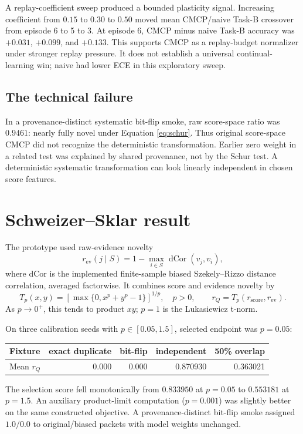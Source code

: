 \documentclass[11pt]{article}
\begin{document}
A replay-coefficient sweep produced a bounded plasticity signal. Increasing coefficient from $0.15$ to $0.30$ to $0.50$ moved mean CMCP/naive Task-B crossover from episode 6 to 5 to 3. At episode 6, CMCP minus naive Task-B accuracy was $+0.031$, $+0.099$, and $+0.133$. This supports CMCP as a replay-budget normalizer under stronger replay pressure. It does not establish a universal continual-learning win; naive had lower ECE in this exploratory sweep.

\subsection{The technical failure}
In a provenance-distinct systematic bit-flip smoke, raw score-space ratio was $0.9461$: nearly fully novel under Equation \ref{eq:schur}. Thus original score-space CMCP did not recognize the deterministic transformation. Earlier zero weight in a related test was explained by shared provenance, not by the Schur test. A deterministic systematic transformation can look linearly independent in chosen score features.

\section{Schweizer--Sklar result}
The prototype used raw-evidence novelty
\begin{equation}
r_{\mathrm{ev}}(j\mid S)=1-\max_{i\in S}\operatorname{dCor}(v_j,v_i),
\end{equation}
where dCor is the implemented finite-sample biased Szekely--Rizzo distance correlation, averaged factorwise. It combines score and evidence novelty by
\begin{equation}
T_p(x,y)=\left[\max\{0,x^p+y^p-1\}\right]^{1/p},\quad p>0,\qquad
r_Q=T_p(r_{\mathrm{score}},r_{\mathrm{ev}}).
\label{eq:ss}
\end{equation}
As $p\to0^+$, this tends to product $xy$; $p=1$ is the Lukasiewicz t-norm.

On three calibration seeds with $p\in[0.05,1.5]$, selected endpoint was $p=0.05$:
\begin{center}
\begin{tabular}{lrrrr}\toprule
Fixture & exact duplicate & bit-flip & independent & 50\% overlap\\\midrule
Mean $r_Q$ & 0.000 & 0.000 & 0.870930 & 0.363021\\\bottomrule
\end{tabular}
\end{center}
The selection score fell monotonically from $0.833950$ at $p=0.05$ to $0.553181$ at $p=1.5$. An auxiliary product-limit computation ($p=0.001$) was slightly better on the same constructed objective. A provenance-distinct bit-flip smoke assigned $1.0/0.0$ to original/biased packets with model weights unchanged.
\end{document}
